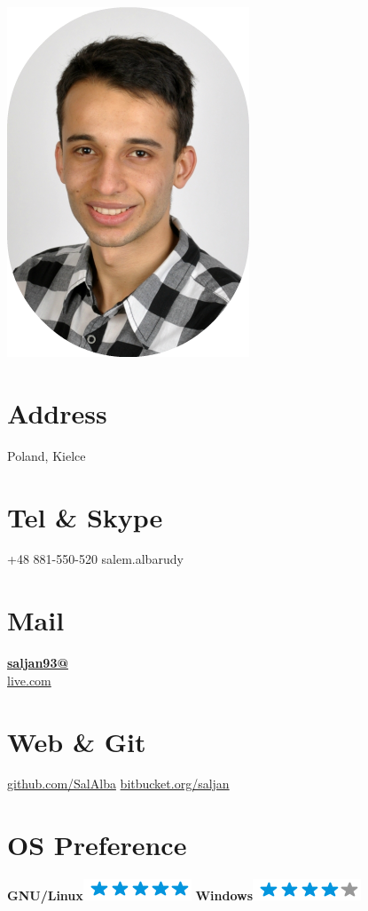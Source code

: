 \documentclass[]{friggeri-cv}
\begin{document}
     

\begin{aside}
	\includegraphics[scale=0.3]{img/rounded_corners-1.png}		
	\section{Address}
		Poland, Kielce
    	~
  	\section{Tel \& Skype}
    	+48 881-550-520
   		salem.albarudy
    	~
  	\section{Mail}
    	\href{mailto:saljan93@live.com}{\textbf{saljan93@}\\live.com}
    	~
  	\section{Web \& Git}
    	\href{https://github.com/SalAlba}{github.com/SalAlba}
	    \href{https://bitbucket.org/saljan}{bitbucket.org/saljan}
    	~
	\section{OS Preference}
    \textbf{GNU/Linux}\includegraphics[scale=0.40]{img/5stars.png}
    \textbf{Windows}\includegraphics[scale=0.40]{img/4stars.png}
    ~

\end{aside}
\end{document}
